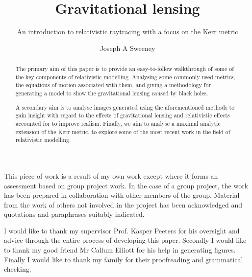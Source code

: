 \documentclass[oneside,openright,frontopenright, singlespacing]{dmathesis}
\begin{document}
\title{Gravitational lensing}
\subtitle{An introduction to relativistic raytracing with a focus on the Kerr metric}
\author{Joseph A Sweeney}
\maketitlepage*

\begin{abstract}
%
	The primary aim of this paper is to provide an easy-to-follow walkthrough of some of the key components of relativistic modelling. Analysing some commonly used metrics, the equations of motion associated with them, and giving a methodology for generating a model to show the gravitational lensing caused by black holes.

\vspace{1em}
	A secondary aim is to analyse images generated using the aforementioned methods to gain insight with regard to the effects of gravitational lensing and relativistic effects accounted for to improve realism. Finally, we aim to analyse a maximal analytic extension of the Kerr metric, to explore some of the most recent work in the field of relativistic modelling.
\end{abstract}

\begin{declaration*}
%
	This piece of work is a result of my own work except where it forms an assessment based on group project work. In the case of a group project, the work has been prepared in collaboration with other members of the group. Material from the work of others not involved in the project has been acknowledged and quotations and paraphrases suitably indicated.
%
\end{declaration*}

\begin{acknowledgements}
%
	I would like to thank my supervisor Prof. Kasper Peeters for his oversight and advice through the entire process of developing this paper. Secondly I would like to thank my good friend Mr Callum Elliott for his help in generating figures. Finally I would like to thank my family for their proofreading and grammatical checking.
%
\end{acknowledgements}

\disableprotrusion
\tableofcontents*
\enableprotrusion

\cleardoublepage
{}
\end{document}
